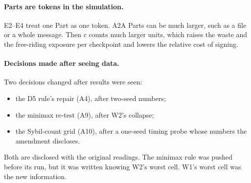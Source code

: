\paragraph{Parts are tokens in the simulation.}
E2--E4 treat one Part as one token. A2A Parts can be much larger, such as a
file or a whole message. Then $c$ counts much larger units, which raises
the waste and the free-riding exposure per checkpoint and lowers the
relative cost of signing.

\paragraph{Decisions made after seeing data.}
Two decisions changed after results were seen:
\begin{itemize}
\item the D5 rule's repair (A4), after two-seed numbers;
\item the minimax re-test (A9), after W2's collapse;
\item the Sybil-count grid (A10), after a one-seed timing probe whose
  numbers the amendment discloses.
\end{itemize}
Both are disclosed with the original readings. The minimax rule was
pushed before its run, but it was written knowing W2's worst cell. W1's
worst cell was the new information.

